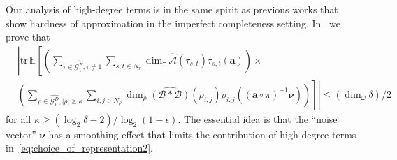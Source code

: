 \documentclass[a4paper,11pt]{article}
\theoremstyle{definition}
\newcommand{\tuple}[1]{{\mathbf{#1}}}
\newcommand{\ex}[1]{\mathbb{E}_{#1}}
\newcommand{\gr}{\mathscr{G}}
\newcommand{\tr}{\mathrm{tr}}
\newcommand{\A}{\mathcal{A}}
\newcommand{\B}{\mathcal{B}}
\begin{document}
Our analysis of high-degree terms is in the same spirit as previous works that show hardness of approximation in the imperfect completeness setting. In~ we prove that
\begin{align*}
& \nonumber  \left| \tr \, \ex{} \left[ \left(
    \sum_{\tau\in \widehat{\gr_1^E}, \tau\neq 1}
    \sum_{s,t\in N_\tau}
\dim_\tau
\widehat{\A}(\tau_{s,t}) \tau_{s,t}(\tuple{a}) \right) \times
\right. \right. 
\\ 
&
\left. \left. 
\left(
\sum_{\rho \in \widehat{\gr_1^D}, |\rho| \geq \kappa}
\sum_{i,j \in N_\rho}
\dim_\rho \widehat{(\B*\B)}(\rho_{i,j}) \rho_{i,j}( (\tuple{a} \circ \pi)^{-1} \bm{\nu})  \right)  \right] \right| \leq (\dim_\omega \delta)/2
\end{align*}
for all $\kappa\geq (\log_2 \delta - 2)/\log_2(1-\epsilon)$. The essential idea is that the ``noise vector'' $\bm{\nu}$ has a smoothing effect that limits the contribution of high-degree terms in~\eqref{eq:choice_of_representation2}. \par
\end{document}
